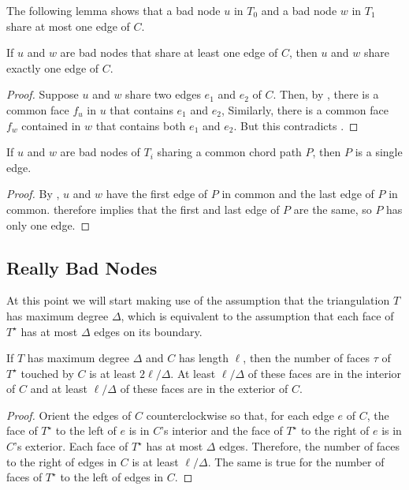\documentclass[a4paper,UKenglish]{socg-lipics-v2019}
\newcommand{\dual}[1]{{#1}^\star}
\begin{document}
The following lemma shows that a bad node $u$ in $T_0$ and a bad node $w$
in $T_1$ share at most one edge of $C$.

\begin{lem}
   If $u$ and $w$ are bad nodes that share at least one edge of $C$, then
   $u$ and $w$ share exactly one edge of $C$.
\end{lem}

\begin{proof}
   Suppose $u$ and $w$ share two edges $e_1$ and $e_2$ of $C$.  Then,
   by , there is a common face $f_u$ in $u$ that
   contains $e_1$ and $e_2$, Similarly, there is a common face $f_w$
   contained in $w$ that contains both $e_1$ and $e_2$.  But this
   contradicts .
\end{proof}


\begin{lem}
   If $u$ and $w$ are bad nodes of $T_i$ sharing a common chord path $P$,
   then $P$ is a single edge.
\end{lem}

\begin{proof}
   By , $u$ and $w$ have the first edge of $P$ in
   common and the last edge of $P$ in common.  
   therefore implies that the first and last edge of $P$ are the same,
   so $P$ has only one edge.
\end{proof}

\subsection{Really Bad Nodes}


At this point we will start making use of the assumption that the
triangulation $T$ has maximum degree $\Delta$, which is equivalent to
the assumption that each face of $\dual{T}$ has at most $\Delta$ edges
on its boundary.

\begin{obs}
  If $T$ has maximum degree $\Delta$ and $C$ has length $\ell$, then
  the number of faces $\tau$ of $\dual{T}$ touched by $C$ is at least 
  $2\ell/\Delta$.  At least $\ell/\Delta$ of these faces are in
  the interior of $C$ and at least $\ell/\Delta$ of these faces are
  in the exterior of $C$.
\end{obs}

\begin{proof}
  Orient the edges of $C$ counterclockwise so that, for each edge
  $e$ of $C$, the face of $\dual{T}$ to the left of $e$ is in $C$'s
  interior and the face of $\dual{T}$ to the right of $e$ is in $C$'s
  exterior.  Each face of $\dual{T}$ has at most $\Delta$ edges.
  Therefore, the number of faces to the right of edges in $C$ is
  at least $\ell/\Delta$. The same is true for the number of faces
  of $\dual{T}$ to the left of edges in $C$.
\end{proof}
\end{document}
